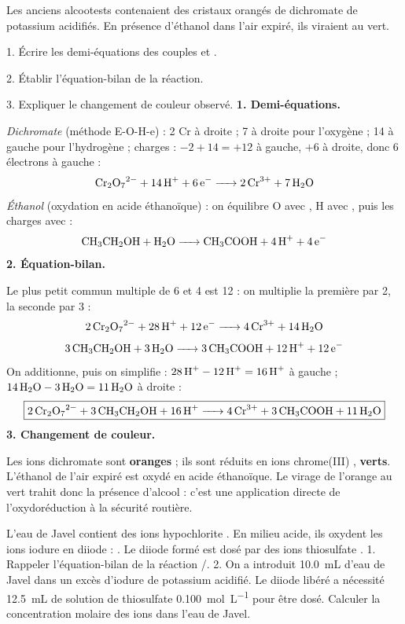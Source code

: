 \documentclass[11pt]{article}
\begin{document}
\begin{exoresolu}
Les anciens alcootests contenaient des cristaux orangés de dichromate de potassium acidifiés. En présence d'éthanol dans l'air expiré, ils viraient au vert.\par
1. Écrire les demi-équations des couples  et .\par
2. Établir l'équation-bilan de la réaction.\par
3. Expliquer le changement de couleur observé.
\tcblower
\textbf{1. Demi-équations.}\par
\emph{Dichromate} (méthode E-O-H-e) : 2 Cr à droite ; 7  à droite pour l'oxygène ; 14  à gauche pour l'hydrogène ; charges : $-2 + 14 = +12$ à gauche, $+6$ à droite, donc 6 électrons à gauche :
\[ \ce{Cr2O7^{2-} + 14H+ + 6e^- -> 2Cr^{3+} + 7H2O} \]
\emph{Éthanol} (oxydation en acide éthanoïque) : on équilibre O avec , H avec , puis les charges avec  :
\[ \ce{CH3CH2OH + H2O -> CH3COOH + 4H+ + 4e^-} \]
\textbf{2. Équation-bilan.}\par
Le plus petit commun multiple de 6 et 4 est 12 : on multiplie la première par 2, la seconde par 3 :
\[ \ce{2Cr2O7^{2-} + 28H+ + 12e^- -> 4Cr^{3+} + 14H2O} \]
\[ \ce{3CH3CH2OH + 3H2O -> 3CH3COOH + 12H+ + 12e^-} \]
On additionne, puis on simplifie : $28\,\ce{H+} - 12\,\ce{H+} = 16\,\ce{H+}$ à gauche ; $14\,\ce{H2O} - 3\,\ce{H2O} = 11\,\ce{H2O}$ à droite :
\[ \boxed{\ce{2Cr2O7^{2-} + 3CH3CH2OH + 16H+ -> 4Cr^{3+} + 3CH3COOH + 11H2O}} \]
\textbf{3. Changement de couleur.}\par
Les ions dichromate  sont \textbf{oranges} ; ils sont réduits en ions chrome(III) , \textbf{verts}. L'éthanol de l'air expiré est oxydé en acide éthanoïque. Le virage de l'orange au vert trahit donc la présence d'alcool : c'est une application directe de l'oxydoréduction à la sécurité routière.
\end{exoresolu}

\begin{exercice}
L'eau de Javel contient des ions hypochlorite . En milieu acide, ils oxydent les ions iodure  en diiode  : . Le diiode formé est dosé par des ions thiosulfate .
1. Rappeler l'équation-bilan de la réaction /.
2. On a introduit \SI{10,0}{mL} d'eau de Javel dans un excès d'iodure de potassium acidifié. Le diiode libéré a nécessité \SI{12,5}{mL} de solution de thiosulfate \SI{0,100}{mol.L^{-1}} pour être dosé. Calculer la concentration molaire des ions  dans l'eau de Javel.
\end{exercice}
\end{document}
